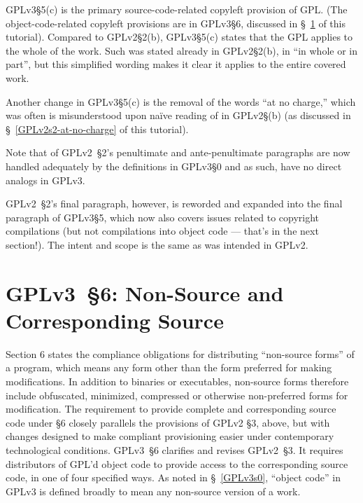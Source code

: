 GPLv3\S5(c) is the primary source-code-related copyleft provision of GPL. (The
object-code-related copyleft provisions are in GPLv3\S6, discussed in
\S~\ref{GPLv3s6} of this tutorial).  Compared to GPLv2\S2(b), GPLv3\S5(c)
states that the GPL applies to the whole of the work.  Such was stated
already in GPLv2\S2(b), in ``in whole or in part'', but this simplified
wording makes it clear it applies to the entire covered work.

Another change in GPLv3\S5(c) is the removal of the
words ``at no charge,'' which was often is misunderstood upon na\"{i}ve
reading of in GPLv2\S(b) (as discussed in \S~\ref{GPLv2s2-at-no-charge} of this
tutorial).



Note that of GPLv2~\S2's penultimate and ante-penultimate paragraphs are now
handled adequately by the definitions in GPLv3\S0 and as such, have no direct
analogs in GPLv3.

GPLv2~\S2's final paragraph, however, is reworded and expanded into the final
paragraph of GPLv3\S5, which now also covers issues related to copyright
compilations (but not compilations into object code --- that's in the next
section!).  The intent and scope is the same as was intended in GPLv2.

\section{GPLv3~\S6: Non-Source and Corresponding Source}
\label{GPLv3s6}


Section 6 states the compliance obligations for distributing ``non-source
forms'' of a program, which means any form other than the form preferred for
making modifications. In addition to binaries or executables, non-source
forms therefore include obfuscated, minimized, compressed or otherwise
non-preferred forms for modification. The requirement to provide complete and corresponding source code under \S6
closely parallels the provisions of GPLv2 \S3, above, but with changes
designed to make compliant provisioning easier under contemporary
technological conditions.
GPLv3~\S6 clarifies and revises GPLv2~\S3.  It requires distributors of GPL'd
object code to provide access to the corresponding source code, in one of
four specified ways.  As noted in \S~\ref{GPLv3s0}, ``object code'' in GPLv3
is defined broadly to mean any non-source version of a work.

